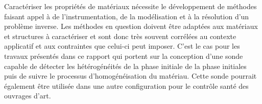 Caractériser les propriétés de matériaux nécessite le développement de méthodes faisant appel à de l'instrumentation, de la modélisation et à la résolution d'un problème inverse. Les méthodes en question doivent être adaptées aux matériaux et structures à caractériser et sont donc très souvent corrélées au contexte applicatif et aux contraintes que celui-ci peut imposer. C'est le cas pour les travaux présentés dans ce rapport qui portent sur la conception d'une sonde capable de détecter les hétérogénéités de la phase initiale de la phase initiales puis de suivre le processus d'homogénéisation du matériau. Cette sonde pourrait également être utilisée dans une autre configuration pour le contrôle santé des ouvrages d'art.\\


